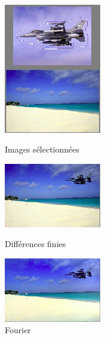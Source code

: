 \begin{figure}[!htb]
   \begin{minipage}{0.33\textwidth}
     \centering
     \includegraphics[width = 120pt]{Images/Resultats/avionPlage.png}
     \caption{Images sélectionnées}
      \end{minipage}\hfill
   \begin{minipage}{0.33\textwidth}
     \centering
     \includegraphics[width = 120pt]{Images/Resultats/avion1.png}
     \caption{Différences finies}
      \end{minipage}\hfill
   \begin{minipage}{0.33\textwidth}
     \centering
     \includegraphics[width= 120pt]{Images/Resultats/avionF.png}
     \caption{Fourier}
   \end{minipage}
\end{figure}
